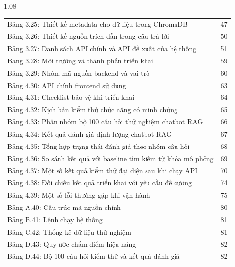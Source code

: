\begin{spacing}{1.08}
\begin{longtable}{@{}p{}r@{}}
Bảng 3.25: Thiết kế metadata cho dữ liệu trong ChromaDB & 47\\
Bảng 3.26: Thiết kế nguồn trích dẫn trong câu trả lời & 50\\
Bảng 3.27: Danh sách API chính và API đề xuất của hệ thống & 51\\
Bảng 3.28: Môi trường và thành phần triển khai & 59\\
Bảng 3.29: Nhóm mã nguồn backend và vai trò & 60\\
Bảng 4.30: API chính frontend sử dụng & 63\\
Bảng 4.31: Checklist bảo vệ khi triển khai & 64\\
Bảng 4.32: Kịch bản kiểm thử chức năng có minh chứng & 65\\
Bảng 4.33: Phân nhóm bộ 100 câu hỏi thử nghiệm chatbot RAG & 66\\
Bảng 4.34: Kết quả đánh giá định lượng chatbot RAG & 67\\
Bảng 4.35: Tổng hợp trạng thái đánh giá theo nhóm câu hỏi & 68\\
Bảng 4.36: So sánh kết quả với baseline tìm kiếm từ khóa mô phỏng & 69\\
Bảng 4.37: Một số kết quả kiểm thử đại diện sau khi chạy API & 70\\
Bảng 4.38: Đối chiếu kết quả triển khai với yêu cầu đề cương & 74\\
Bảng 4.39: Một số lỗi thường gặp khi vận hành & 75\\
Bảng A.40: Cấu trúc mã nguồn chính & 80\\
Bảng B.41: Lệnh chạy hệ thống & 81\\
Bảng C.42: Thống kê dữ liệu thử nghiệm & 81\\
Bảng D.43: Quy ước chấm điểm hiệu năng & 82\\
Bảng D.44: Bộ 100 câu hỏi kiểm thử và kết quả đánh giá & 82\\
\end{longtable}
\end{spacing}
